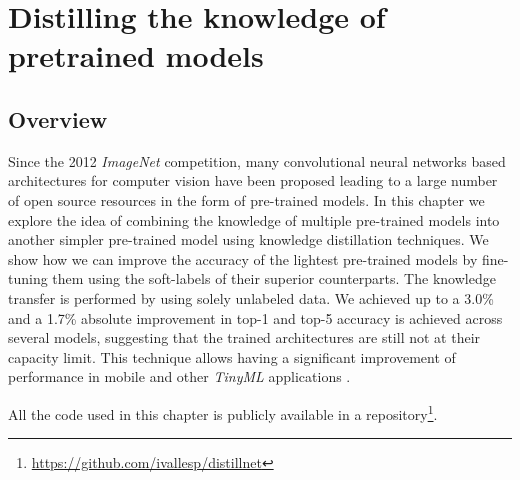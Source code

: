 \chapter{Distilling the knowledge of pretrained models} \label{ch:distillation}
\section{Overview}
Since the 2012 \textit{ImageNet} competition, many convolutional neural networks based architectures for computer vision have been proposed leading to a large number of open source resources in the form of pre-trained models. In this chapter we explore the idea of combining the knowledge of multiple pre-trained models into another simpler pre-trained model using knowledge distillation techniques. We show how we can improve the accuracy of the lightest pre-trained models by fine-tuning them using the soft-labels of their superior counterparts. The knowledge transfer is performed by using solely unlabeled data. We achieved up to a 3.0\% and a 1.7\% absolute improvement in top-1 and top-5 accuracy is achieved across several models, suggesting that the trained architectures are still not at their capacity limit. This technique allows having a significant improvement of performance in mobile and other \textit{TinyML} applications \autocite{sanchez2020}.

 All the code used in this chapter is publicly available in a repository\footnote{\url{https://github.com/ivallesp/distillnet}}.


